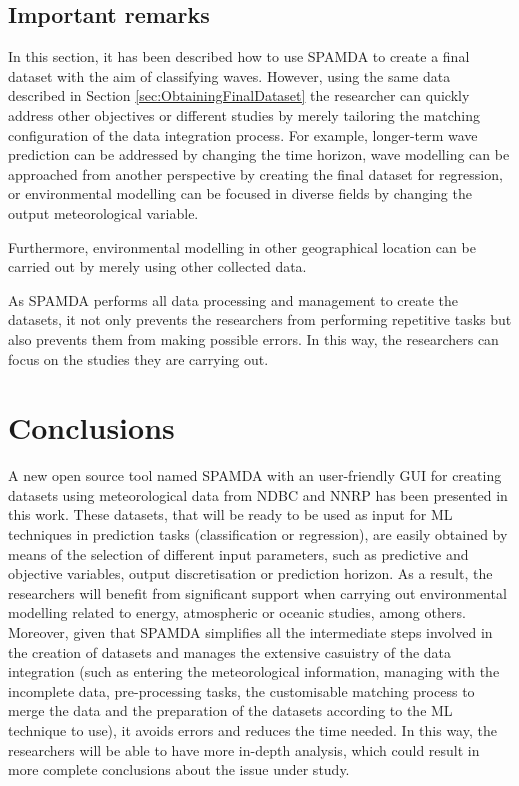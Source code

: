 \documentclass[energies,article,submit,moreauthors,pdftex]{Definitions/mdpi}
\begin{document}
		\subsection{Important remarks}
		
			In this section, it has been described how to use SPAMDA to create a final dataset with the aim of classifying waves. However, using the same data described in Section \ref{sec:ObtainingFinalDataset} the researcher can quickly address other objectives or different studies by merely tailoring the matching configuration of the data integration process. For example, longer-term wave prediction can be addressed by changing the time horizon, wave modelling can be approached from another perspective by creating the final dataset for regression, or environmental modelling can be focused in diverse fields by changing the output meteorological variable.

			Furthermore, environmental modelling in other geographical location can be carried out by merely using other collected data.
			
			As SPAMDA performs all data processing and management to create the datasets, it not only prevents the researchers from performing repetitive tasks but also prevents them from making possible errors. In this way, the researchers can focus on the studies they are carrying out.
		
	\section{Conclusions}\label{sec:Conclusions}

		A new open source tool named SPAMDA with an user-friendly GUI for creating datasets using meteorological data from NDBC and NNRP has been presented in this work. These datasets, that will be ready to be used as input for ML techniques in prediction tasks (classification or regression), are easily obtained by means of the selection of different input parameters, such as predictive and objective variables, output discretisation or prediction horizon. As a result, the researchers will benefit from significant support when carrying out environmental modelling related to energy, atmospheric or oceanic studies, among others. Moreover, given that SPAMDA simplifies all the intermediate steps involved in the creation of datasets and manages the extensive casuistry of the data integration (such as entering the meteorological information, managing with the incomplete data, pre-processing tasks, the customisable matching process to merge the data and the preparation of the datasets according to the ML technique to use), it avoids errors and reduces the time needed. In this way, the researchers will be able to have more in-depth analysis, which could result in more complete conclusions about the issue under study.
\end{document}
